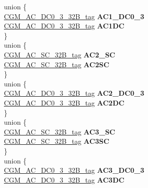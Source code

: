 \begin{DoxyCompactItemize}
\begin{tabbing}
\>\>union \{\\
\>\>\>\mbox{\hyperlink{unionCGM__AC__DC0__3__32B__tag}{CGM\_AC\_DC0\_3\_32B\_tag}} {\bfseries AC1\_DC0\_3}\\
\>\>\>\mbox{\hyperlink{unionCGM__AC__DC0__3__32B__tag}{CGM\_AC\_DC0\_3\_32B\_tag}} {\bfseries AC1DC}\\
\>\>\} \\
\mbox{\label{structCGM__struct__tag_1_1_0D1678_1_1_0D1686_a3862b4b0ae9423d4289a732a9e99c5ac}} 
\>\>union \{\\
\>\>\>\mbox{\hyperlink{unionCGM__AC__SC__32B__tag}{CGM\_AC\_SC\_32B\_tag}} {\bfseries AC2\_SC}\\
\>\>\>\mbox{\hyperlink{unionCGM__AC__SC__32B__tag}{CGM\_AC\_SC\_32B\_tag}} {\bfseries AC2SC}\\
\>\>\} \\
\mbox{\label{structCGM__struct__tag_1_1_0D1678_1_1_0D1686_aa98a585ae39d14abb367c92f38979523}} 
\>\>union \{\\
\>\>\>\mbox{\hyperlink{unionCGM__AC__DC0__3__32B__tag}{CGM\_AC\_DC0\_3\_32B\_tag}} {\bfseries AC2\_DC0\_3}\\
\>\>\>\mbox{\hyperlink{unionCGM__AC__DC0__3__32B__tag}{CGM\_AC\_DC0\_3\_32B\_tag}} {\bfseries AC2DC}\\
\>\>\} \\
\mbox{\label{structCGM__struct__tag_1_1_0D1678_1_1_0D1686_a0ba01eb9fbabb251de66a13f57ea4fc7}} 
\>\>union \{\\
\>\>\>\mbox{\hyperlink{unionCGM__AC__SC__32B__tag}{CGM\_AC\_SC\_32B\_tag}} {\bfseries AC3\_SC}\\
\>\>\>\mbox{\hyperlink{unionCGM__AC__SC__32B__tag}{CGM\_AC\_SC\_32B\_tag}} {\bfseries AC3SC}\\
\>\>\} \\
\mbox{\label{structCGM__struct__tag_1_1_0D1678_1_1_0D1686_a2b5a4d6652b5924cb8e36834e7b3a439}} 
\>\>union \{\\
\>\>\>\mbox{\hyperlink{unionCGM__AC__DC0__3__32B__tag}{CGM\_AC\_DC0\_3\_32B\_tag}} {\bfseries AC3\_DC0\_3}\\
\>\>\>\mbox{\hyperlink{unionCGM__AC__DC0__3__32B__tag}{CGM\_AC\_DC0\_3\_32B\_tag}} {\bfseries AC3DC}\\

\end{tabbing}
\end{DoxyCompactItemize}
